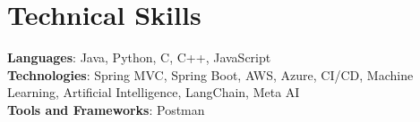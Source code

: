 \section{Technical Skills}
    \begin{itemize}[leftmargin=0.15in, label={}]
	\small{\item{
		\textbf{Languages}{: Java, Python, C, C++, JavaScript} \\
		\textbf{Technologies}{: Spring MVC, Spring Boot, AWS, Azure, CI/CD, Machine Learning, Artificial Intelligence, LangChain, Meta AI} \\
		\textbf{Tools and Frameworks}{: Postman}
	}}
    \end{itemize}